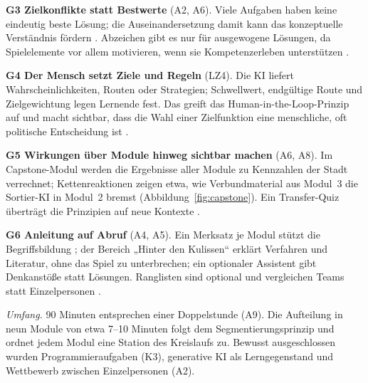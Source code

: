 \documentclass[sigconf,nonacm]{acmart}
\begin{document}
\textbf{G3 Zielkonflikte statt Bestwerte} (A2, A6). Viele Aufgaben haben keine eindeutig beste Lösung; die Auseinandersetzung damit kann das konzeptuelle Verständnis fördern \cite{kapur2008}. Abzeichen gibt es nur für ausgewogene Lösungen, da Spielelemente vor allem motivieren, wenn sie Kompetenzerleben unterstützen \cite{vanroy2019}.

\textbf{G4 Der Mensch setzt Ziele und Regeln} (LZ4). Die KI liefert Wahrscheinlichkeiten, Routen oder Strategien; Schwellwert, endgültige Route und Zielgewichtung legen Lernende fest. Das greift das Human-in-the-Loop-Prinzip auf \cite{zheng2017} und macht sichtbar, dass die Wahl einer Zielfunktion eine menschliche, oft politische Entscheidung ist \cite{sterman2000,meadows2008}.

\textbf{G5 Wirkungen über Module hinweg sichtbar machen} (A6, A8). Im Capstone-Modul werden die Ergebnisse aller Module zu Kennzahlen der Stadt verrechnet; Kettenreaktionen zeigen etwa, wie Verbundmaterial aus Modul~3 die Sortier-KI in Modul~2 bremst (Abbildung~\ref{fig:capstone}). Ein Transfer-Quiz überträgt die Prinzipien auf neue Kontexte \cite{perkins1992}.

\textbf{G6 Anleitung auf Abruf} (A4, A5). Ein Merksatz je Modul stützt die Begriffsbildung \cite{kolb1984}; der Bereich „Hinter den Kulissen“ erklärt Verfahren und Literatur, ohne das Spiel zu unterbrechen; ein optionaler Assistent gibt Denkanstöße statt Lösungen. Ranglisten sind optional und vergleichen Teams statt Einzelpersonen \cite{hanus2015,hamari2014}.

\textit{Umfang.} 90 Minuten entsprechen einer Doppelstunde (A9). Die Aufteilung in neun Module von etwa 7--10 Minuten folgt dem Segmentierungsprinzip \cite{mayer2009} und ordnet jedem Modul eine Station des Kreislaufs zu. Bewusst ausgeschlossen wurden Programmieraufgaben (K3), generative KI als Lerngegenstand und Wettbewerb zwischen Einzelpersonen (A2).
\end{document}
